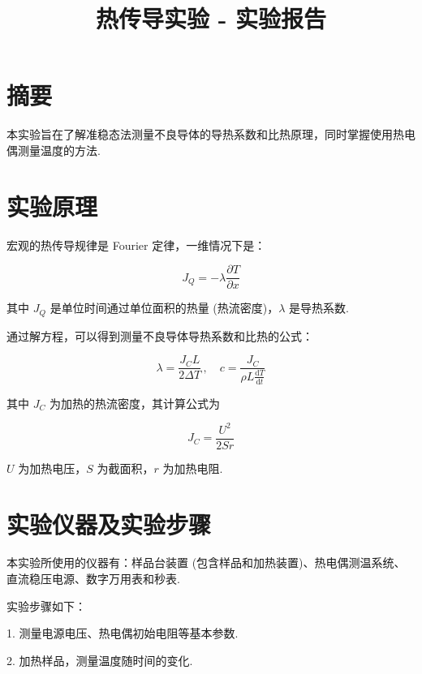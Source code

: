 \documentclass{customDoc}
\begin{document}
\title{热传导实验 - 实验报告}
\maketitle

\section{摘要}

本实验旨在了解准稳态法测量不良导体的导热系数和比热原理，同时掌握使用热电偶测量温度的方法.

\section{实验原理}

宏观的热传导规律是 Fourier 定律，一维情况下是：

\begin{equation}
    J_Q = -\lambda \frac{\partial T}{\partial x}
\end{equation}

其中 $J_Q$ 是单位时间通过单位面积的热量 (热流密度)，$\lambda$ 是导热系数.

通过解方程，可以得到测量不良导体导热系数和比热的公式：

\begin{equation}
    \lambda = \frac{J_C L}{2\Delta T}\,,\quad c = \frac{J_C}{\rho L \frac{\text{d}T}{\text{d}t}}
\end{equation}

其中 $J_C$ 为加热的热流密度，其计算公式为

\begin{equation}
    J_C = \frac{U^2}{2Sr}
\end{equation}

$U$ 为加热电压，$S$ 为截面积，$r$ 为加热电阻.

\section{实验仪器及实验步骤}

本实验所使用的仪器有：样品台装置 (包含样品和加热装置)、热电偶测温系统、直流稳压电源、数字万用表和秒表.\newline


实验步骤如下：\newline


1. 测量电源电压、热电偶初始电阻等基本参数.

2. 加热样品，测量温度随时间的变化.
\end{document}
